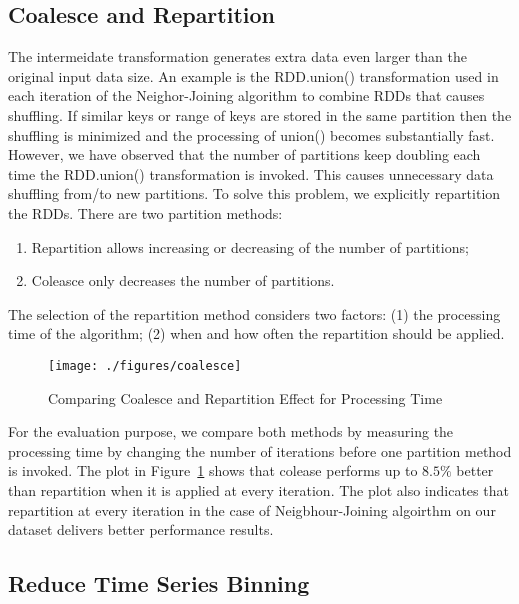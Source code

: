 \subsection{Coalesce and Repartition}
The intermeidate transformation generates extra data even larger than the original input data size. An example is the \textsf{RDD.union()} transformation used in each iteration of the Neighor-Joining algorithm to combine RDDs that causes shuffling. If similar keys or range of keys are stored in the same partition then the shuffling is minimized and the processing of \textsf{union()} becomes substantially fast. However, we have observed that the number of partitions keep doubling each time the \textsf{RDD.union()} transformation is invoked. This causes unnecessary data shuffling from/to new partitions. To solve this problem, we explicitly repartition the RDDs. There are two partition methods:

\begin{enumerate}
	\item \textsf{Repartition} allows increasing or decreasing of the number of partitions; 
	\item \textsf{Coleasce} only decreases the number of partitions.
\end{enumerate} 

The selection of the repartition method considers two factors: (1) the processing time of the algorithm; (2) when and how often the repartition should be applied. 

\begin{figure}
	\centering
	\texttt{[image: ./figures/coalesce]}
	\caption{Comparing Coalesce and Repartition Effect for Processing Time}
	\label{fig:repartition}
	
\end{figure}

For the evaluation purpose, we compare both methods by measuring the processing time by changing the number of iterations before one partition method is invoked. The plot in Figure~\ref{fig:repartition} shows that colease performs up to $8.5\%$ better than repartition when it is applied at every iteration. The plot also indicates that repartition at every iteration in the case of Neigbhour-Joining algoirthm on our dataset delivers better performance results.   


\subsection{Reduce Time Series Binning}


